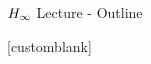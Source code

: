 \documentclass{beamer}
\newcommand{\onlyinsubfile}[1]{#1}
\newcommand{\notinsubfile}[1]{}
\begin{document}
\renewcommand{\onlyinsubfile}[1]{}
\renewcommand{\notinsubfile}[1]{#1}

\nocite{*}



\begin{frame}{$H_{\infty}$ Lecture - Outline}
    \tableofcontents[]
\end{frame}





[customblank]




% 


\end{document}
